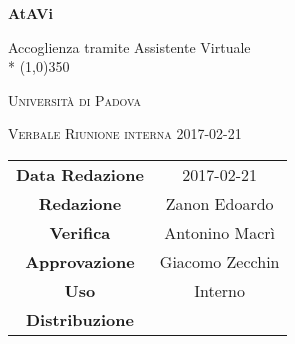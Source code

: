 \documentclass[a4paper,12pt]{article}
\author{Nome Autore}
\date{16/02/2016}
\begin{document}
\begin{titlepage}
	\centering
	{\huge\bfseries AtAVi\par}
	Accoglienza tramite Assistente Virtuale \\*
	\line(1,0){350} \\
	{\scshape\LARGE Università di Padova \par}
	\vspace{1cm}
	{\scshape\Large Verbale Riunione interna 2017-02-21\par}
	\vspace{1.5cm}
	\logo
	\vspace{2cm}	
	\vfill \vfill
	\begin{tabular}{c|c}
		{\hfill\textbf{Data Redazione}} 		& 2017-02-21	\\
		{\hfill\textbf{Redazione}} 			& Zanon Edoardo		\\
		{\hfill\textbf{Verifica}} 				&  Antonino Macrì \\
		{\hfill\textbf{Approvazione}} 				&  Giacomo Zecchin  \\
		{\hfill\textbf{Uso}} 				& Interno		\\
		{\hfill\textbf{Distribuzione}} 			& \kpanic\		\\
	\end{tabular}
\end{titlepage}

	\pagestyle{myfront}
	\newpage
	\tableofcontents
	
	\label{LastFrontPage}
	
	\newpage
	\pagestyle{mymain}
		
		
		
		
		
		
		
		
	
	\label{LastPage}
\end{document}
